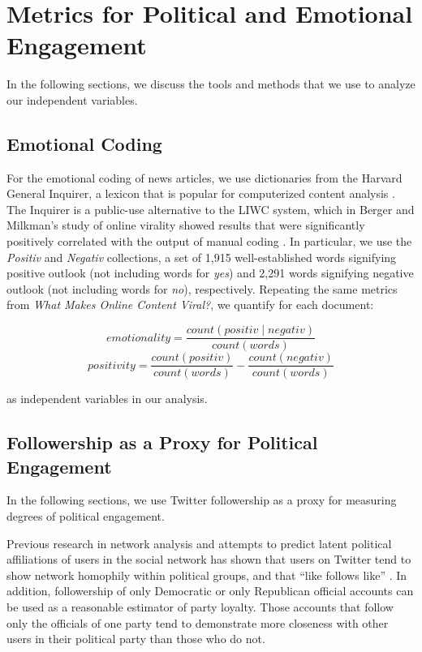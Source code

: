  \chapter{Metrics for Political and Emotional Engagement}

 In the following sections, we discuss the tools and methods that we use to analyze our independent variables.
 
\section{Emotional Coding}
For the emotional coding of news articles, we use dictionaries from the Harvard General Inquirer, a lexicon that is popular for computerized content analysis \cite{ stone1963computer}. The Inquirer is a public-use alternative to the LIWC system, which in Berger and Milkman’s study of online virality showed results that were significantly positively correlated with the output of manual coding \cite{berger2012makes}. In particular, we use the \emph{Positiv} and \emph{Negativ} collections, a set of 1,915 well-established words signifying positive outlook (not including words for \emph{yes}) and 2,291 words signifying negative outlook (not including words for \emph{no}), respectively. Repeating the same metrics from \emph{What Makes Online Content Viral?}, we quantify for each document:

$$ emotionality = \frac{count(positiv \mid negativ)}{count(words)}$$
$$ positivity = \frac{count(positiv)}{count(words)} - \frac{count(negativ)}{count(words)}$$

as independent variables in our analysis.

 \section{Followership as a Proxy for Political Engagement}

In the following sections, we use Twitter followership as a proxy for measuring degrees of political engagement. 

Previous research in network analysis and attempts to predict latent political affiliations of users in the social network has shown that users on Twitter tend to show network homophily within political groups, and that ``like follows like'' \cite{colleoni2014echo}. In addition, followership of only Democratic or only Republican official accounts can be used as a reasonable estimator of party loyalty. Those accounts that follow only the officials of one party tend to demonstrate more closeness with other users in their political party than those who do not.
            
